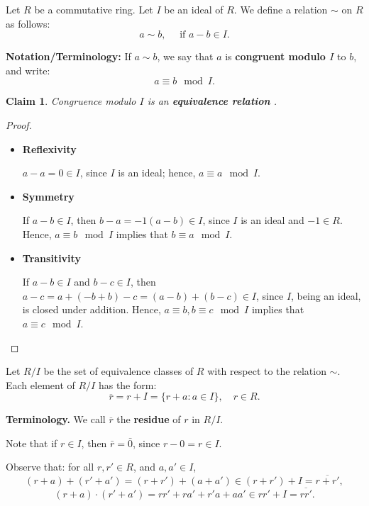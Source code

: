 \documentclass[a4paper,12pt]{report}
\newcommand{\ol}[1]{\overline{#1}}
\newcounter{statement}
\numberwithin{statement}{chapter}
\newtheorem{claim}[statement]{Claim}
\numberwithin{equation}{chapter}
\numberwithin{section}{chapter}
\numberwithin{subsection}{section}
\begin{document}
Let $R$ be a commutative ring.  Let $I$ be an ideal of $R$.
We define a relation $\sim$ on $R$ as follows:
\[
a \sim b, \quad \text{ if } a - b \in I.
\]



 {\bf Notation/Terminology:} 
If $a \sim b$, we say that $a$ is  {\bf congruent modulo $I$}  to $b$,
and write:
\[
a \equiv b \mod I.
\]



\begin{claim}

Congruence modulo $I$ is an  {\bf equivalence relation} .
\end{claim}
\begin{proof}

\begin{itemize}
\item 
 {\bf Reflexivity} 

$a - a = 0 \in I$, since $I$ is an ideal; hence, $a \equiv a \mod I$.


\item 
 {\bf Symmetry} 

If $a - b \in I$, then $b - a = -1(a  - b) \in I$, since $I$
is an ideal and $-1 \in R$.  Hence, $a \equiv b \mod I$ implies that $b \equiv a \mod I$.


\item 
 {\bf Transitivity} 

If $a - b \in I$ and $b - c \in I$, then
$a - c = a + (- b + b) - c = (a - b) + (b - c) \in I$,
since $I$, being an ideal, is closed under addition.
Hence, $a \equiv b, b \equiv c \mod I$ implies that $a \equiv c \mod I$.


\end{itemize}

\end{proof}




Let $R/ I$ be the set of equivalence classes of $R$ with respect to the relation $\sim$.
Each element of $R/ I$ has the form:
\[
\ol{r} = r + I = \{r + a : a \in I\}, \quad r \in R.
\]

 {\bf Terminology.} 
We call $\ol{r}$ the  {\bf residue}  of $r$ in $R/I$.



Note that if $r \in I$, then $\bar{r} = \bar{0}$, since $r - 0 = r \in I$.


Observe that: for all $r, r' \in R$, and $a, a' \in I$,
\[
(r + a) + (r' + a') = (r + r') + (a + a') \in (r + r') + I = \ol{r + r'},
\]
\[
(r + a)\cdot(r'+ a') = rr' + ra' + r'a + aa' \in rr' + I = \ol{rr'}.
\]
\end{document}
